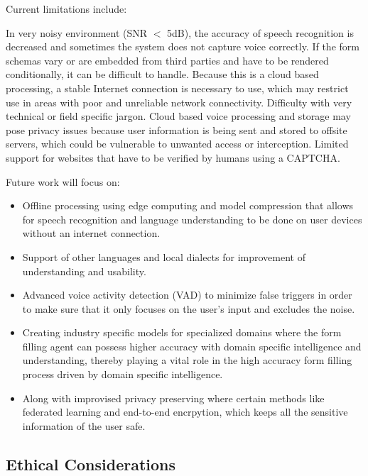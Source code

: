 \documentclass[conference]{IEEEtran}
\begin{document}
Current limitations include:

\begin{itemize}
In very noisy environment (SNR $<$ 5dB), the accuracy of speech recognition is decreased and sometimes the system does not capture voice correctly.
If the form schemas vary or are embedded from third parties and have to be rendered conditionally, it can be difficult to handle.
Because this is a cloud based processing, a stable Internet connection is necessary to use, which may restrict use in areas with poor and unreliable network connectivity.
Difficulty with very technical or field specific jargon.
Cloud based voice processing and storage may pose privacy issues because user information is being sent and stored to offsite servers, which could be vulnerable to unwanted access or interception.
Limited support for websites that have to be verified by humans using a CAPTCHA.

\end{itemize}

Future work will focus on:

\begin{itemize}
\item Offline processing using edge computing and model compression that allows for speech recognition and language understanding to be done on user devices without an internet connection.
\item Support of other languages and local dialects for improvement of understanding and usability.
\item Advanced voice activity detection (VAD) to minimize false triggers in order to make sure that it only focuses on the user's input and excludes the noise.
\item Creating industry specific models for specialized domains where the form filling agent can possess higher accuracy with domain specific intelligence and understanding, thereby playing a vital role in the high accuracy form filling process driven by domain specific intelligence. 
\item Along with improvised privacy preserving where certain methods like federated learning and end-to-end encrpytion, which keeps all the sensitive information of the user safe.
\end{itemize}

\subsection{Ethical Considerations}
\end{document}
